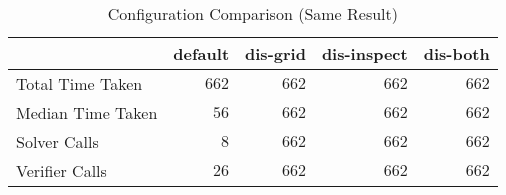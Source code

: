\begin{table}[!h]
\caption{Configuration Comparison (Same Result)}
\label{Ta:configuration_comparison_same}
\begin{center}

\def\arraystretch{1.1}
\setlength\tabcolsep{7pt}

\begin{tabular}{|l|r|r|r|r|}
\hline

\multicolumn{1}{|c|}{} & \multicolumn{1}{|c|}{\textbf{default}} & \multicolumn{1}{|c|}{\textbf{dis-grid}} & \multicolumn{1}{|c|}{\textbf{dis-inspect}} & \multicolumn{1}{|c|}{\textbf{dis-both}} \\ \hline \hline
Total Time Taken & $662$ & $662$ & $662$ & $662$\\ \hline
Median Time Taken & $56$ & $662$ & $662$ & $662$\\ \hline
Solver Calls & $8$ & $662$ & $662$ & $662$\\ \hline
Verifier Calls & $26$ & $662$ & $662$ & $662$\\ \hline

\end{tabular}

\end{center}
\end{table}
